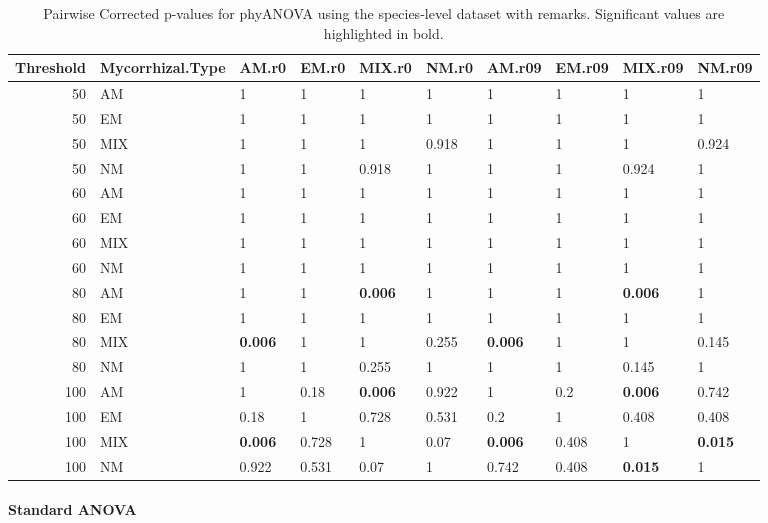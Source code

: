 \documentclass[]{article}
\let\oldparagraph\paragraph
\renewcommand{\paragraph}[1]{\oldparagraph{#1}\mbox{}}
\begin{document}
\begin{table}[H]

\caption{\label{tab:unnamed-chunk-14}Pairwise Corrected p-values for phyANOVA using the species-level dataset with remarks. Significant values are highlighted in bold.}
\centering
\begin{tabular}{r|l|l|l|l|l|l|l|l|l}
\hline
Threshold & Mycorrhizal.Type & AM.r0 & EM.r0 & MIX.r0 & NM.r0 & AM.r09 & EM.r09 & MIX.r09 & NM.r09\\
\hline
50 & AM & 1 & 1 & 1 & 1 & 1 & 1 & 1 & 1\\
\hline
50 & EM & 1 & 1 & 1 & 1 & 1 & 1 & 1 & 1\\
\hline
50 & MIX & 1 & 1 & 1 & 0.918 & 1 & 1 & 1 & 0.924\\
\hline
50 & NM & 1 & 1 & 0.918 & 1 & 1 & 1 & 0.924 & 1\\
\hline
60 & AM & 1 & 1 & 1 & 1 & 1 & 1 & 1 & 1\\
\hline
60 & EM & 1 & 1 & 1 & 1 & 1 & 1 & 1 & 1\\
\hline
60 & MIX & 1 & 1 & 1 & 1 & 1 & 1 & 1 & 1\\
\hline
60 & NM & 1 & 1 & 1 & 1 & 1 & 1 & 1 & 1\\
\hline
80 & AM & 1 & 1 & \textbf{0.006} & 1 & 1 & 1 & \textbf{0.006} & 1\\
\hline
80 & EM & 1 & 1 & 1 & 1 & 1 & 1 & 1 & 1\\
\hline
80 & MIX & \textbf{0.006} & 1 & 1 & 0.255 & \textbf{0.006} & 1 & 1 & 0.145\\
\hline
80 & NM & 1 & 1 & 0.255 & 1 & 1 & 1 & 0.145 & 1\\
\hline
100 & AM & 1 & 0.18 & \textbf{0.006} & 0.922 & 1 & 0.2 & \textbf{0.006} & 0.742\\
\hline
100 & EM & 0.18 & 1 & 0.728 & 0.531 & 0.2 & 1 & 0.408 & 0.408\\
\hline
100 & MIX & \textbf{0.006} & 0.728 & 1 & 0.07 & \textbf{0.006} & 0.408 & 1 & \textbf{0.015}\\
\hline
100 & NM & 0.922 & 0.531 & 0.07 & 1 & 0.742 & 0.408 & \textbf{0.015} & 1\\
\hline
\end{tabular}
\end{table}

\hypertarget{standard-anova-3}{%
\paragraph{Standard ANOVA}\label{standard-anova-3}}
\end{document}
